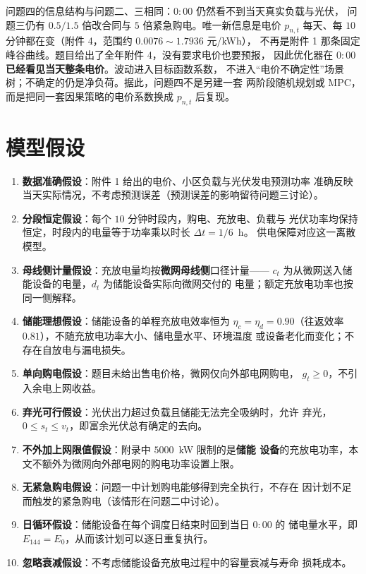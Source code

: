 \documentclass[withoutpreface,bwprint]{cumcmthesis}
\begin{document}
问题四的信息结构与问题二、三相同：$0{:}00$ 仍然看不到当天真实负载与光伏，
问题三仍有 $0.5/1.5$ 倍改合同与 $5$ 倍紧急购电。唯一新信息是电价 $p_{n,t}$
每天、每 $10$ 分钟都在变（附件 4，范围约 $0.0076\sim 1.7936$ 元/kWh），
不再是附件 1 那条固定峰谷曲线。题目给出了全年附件 4，没有要求电价也要预报，
因此优化器在 $0{:}00$ \textbf{已经看见当天整条电价}。波动进入目标函数系数，
不进入“电价不确定性”场景树；不确定的仍是净负荷。据此，问题四不是另建一套
两阶段随机规划或 MPC，而是把同一套因果策略的电价系数换成 $p_{n,t}$ 后复现。

\section{模型假设}

\begin{enumerate}
  \item \textbf{数据准确假设}：附件 1 给出的电价、小区负载与光伏发电预测功率
        准确反映当天实际情况，不考虑预测误差（预测误差的影响留待问题三讨论）。
  \item \textbf{分段恒定假设}：每个 $10$ 分钟时段内，购电、充放电、负载与
        光伏功率均保持恒定，时段内的电量等于功率乘以时长 $\Delta t = 1/6$~h。
        供电保障对应这一离散模型。
  \item \textbf{母线侧计量假设}：充放电量均按\textbf{微网母线侧}口径计量——
        $c_t$ 为从微网送入储能设备的电量，$d_t$ 为储能设备实际向微网交付的
        电量；额定充放电功率也按同一侧解释。
  \item \textbf{储能理想假设}：储能设备的单程充放电效率恒为 $\eta_c=\eta_d
        = 0.90$（往返效率 $0.81$），不随充放电功率大小、储电量水平、环境温度
        或设备老化而变化；不存在自放电与漏电损失。
  \item \textbf{单向购电假设}：题目未给出售电价格，微网仅向外部电网购电，
        $g_t \ge 0$，不引入余电上网收益。
  \item \textbf{弃光可行假设}：光伏出力超过负载且储能无法完全吸纳时，允许
        弃光，$0 \le s_t \le v_t$，即富余光伏总有确定的去向。
  \item \textbf{不外加上网限值假设}：附录中 $5000$~kW 限制的是\textbf{储能
        设备}的充放电功率，本文不额外为微网向外部电网的购电功率设置上限。
  \item \textbf{无紧急购电假设}：问题一中计划购电能够得到完全执行，不存在
        因计划不足而触发的紧急购电（该情形在问题二中讨论）。
  \item \textbf{日循环假设}：储能设备在每个调度日结束时回到当日 $0{:}00$ 的
        储电量水平，即 $E_{144} = E_0$，从而该计划可以逐日重复执行。
  \item \textbf{忽略衰减假设}：不考虑储能设备充放电过程中的容量衰减与寿命
        损耗成本。
\end{enumerate}
\end{document}

